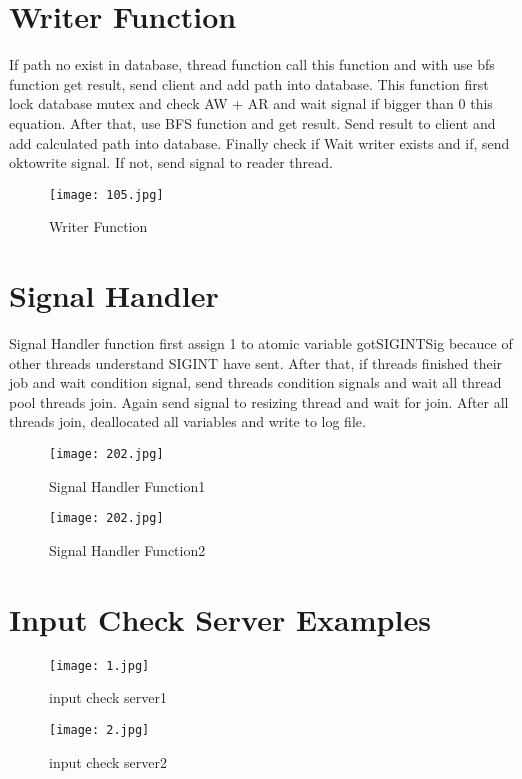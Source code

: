 \documentclass{article}
\begin{document}
\section{Writer Function}
If path no exist in database, thread function call this function and with use bfs function get result, send client and add path into database. This function first lock database mutex and check AW + AR and wait signal if bigger than 0 this equation. After that, use BFS function and get result. Send result to client and add calculated path into database. Finally check if Wait writer exists and if, send oktowrite signal. If not, send signal to reader thread.

\begin{figure}[h!] 
    \centering
    \texttt{[image: 105.jpg]}
    \caption{Writer Function}
\end{figure}

\section{Signal Handler}
Signal Handler function first assign 1 to atomic variable gotSIGINTSig becauce of other threads understand SIGINT have sent. After that, if threads finished their job and wait condition signal, send threads condition signals and wait all thread pool threads join. Again send signal to resizing thread and wait for join. After all threads join, deallocated all variables and write to log file. 
\begin{figure}[h!] 
    \centering
    \texttt{[image: 202.jpg]}
    \caption{Signal Handler Function1}
\end{figure}
\newpage

\begin{figure}[h!] 
    \centering
    \texttt{[image: 202.jpg]}
    \caption{Signal Handler Function2}
\end{figure}

\section{Input Check Server Examples}

\begin{figure}[h!] 
    \centering
    \texttt{[image: 1.jpg]}
    \caption{input check server1}
\end{figure}

\begin{figure}[h!] 
    \centering
    \texttt{[image: 2.jpg]}
    \caption{input check server2}
\end{figure}
\end{document}
